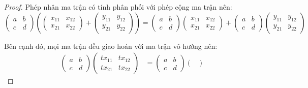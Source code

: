 \documentclass[class=nhvh-linear-algebra,crop=false]{standalone}
\begin{document}
\begin{proof}
    Phép nhân ma trận có tính phân phối với phép cộng ma trận nên:
    \[
        \begin{pmatrix}
            a & b \\
            c & d
        \end{pmatrix}
        \left(
        \begin{pmatrix}
                x_{11} & x_{12} \\
                x_{21} & x_{22}
            \end{pmatrix}
        +
        \begin{pmatrix}
                y_{11} & y_{12} \\
                y_{21} & y_{22}
            \end{pmatrix}
        \right)
        =
        \begin{pmatrix}
            a & b \\
            c & d
        \end{pmatrix}
        \begin{pmatrix}
            x_{11} & x_{12} \\
            x_{21} & x_{22}
        \end{pmatrix}
        +
        \begin{pmatrix}
            a & b \\
            c & d
        \end{pmatrix}
        \begin{pmatrix}
            y_{11} & y_{12} \\
            y_{21} & y_{22}
        \end{pmatrix}
    \]
    \par Bên cạnh đó, mọi ma trận đều giao hoán với ma trận vô hướng nên:
    \begin{align*}
        \begin{pmatrix}
            a & b \\
            c & d
        \end{pmatrix}
        \begin{pmatrix}
            tx_{11} & tx_{12} \\
            tx_{21} & tx_{22}
        \end{pmatrix} & =
        \begin{pmatrix}
            a & b \\
            c & d
        \end{pmatrix}
        \begin{pmatrix}

\end{pmatrix}
\end{align*}
\end{proof}
\end{document}
